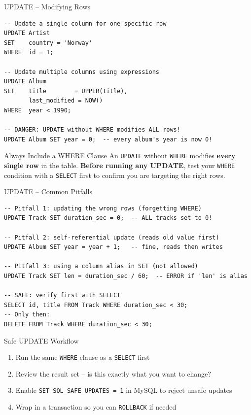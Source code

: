 \begin{frame}[fragile]{UPDATE -- Modifying Rows}
  \begin{lstlisting}[style=sqlstyle]
-- Update a single column for one specific row
UPDATE Artist
SET    country = 'Norway'
WHERE  id = 1;

-- Update multiple columns using expressions
UPDATE Album
SET    title        = UPPER(title),
       last_modified = NOW()
WHERE  year < 1990;

-- DANGER: UPDATE without WHERE modifies ALL rows!
UPDATE Album SET year = 0;  -- every album's year is now 0!
  \end{lstlisting}

  \begin{alertblock}{Always Include a WHERE Clause}
    An \texttt{UPDATE} without \texttt{WHERE} modifies \textbf{every single row} in the table.
    \textbf{Before running any UPDATE}, test your \texttt{WHERE} condition with a \texttt{SELECT}
    first to confirm you are targeting the right rows.
  \end{alertblock}
\end{frame}

\begin{frame}[fragile]{UPDATE -- Common Pitfalls}
  \begin{lstlisting}[style=sqlstyle]
-- Pitfall 1: updating the wrong rows (forgetting WHERE)
UPDATE Track SET duration_sec = 0;  -- ALL tracks set to 0!

-- Pitfall 2: self-referential update (reads old value first)
UPDATE Album SET year = year + 1;   -- fine, reads then writes

-- Pitfall 3: using a column alias in SET (not allowed)
UPDATE Track SET len = duration_sec / 60;  -- ERROR if 'len' is alias

-- SAFE: verify first with SELECT
SELECT id, title FROM Track WHERE duration_sec < 30;
-- Only then:
DELETE FROM Track WHERE duration_sec < 30;
  \end{lstlisting}

  \begin{block}{Safe UPDATE Workflow}
    \begin{enumerate}
      \item Run the same \texttt{WHERE} clause as a \texttt{SELECT} first
      \item Review the result set -- is this exactly what you want to change?
      \item Enable \texttt{SET SQL\_SAFE\_UPDATES = 1} in MySQL to reject unsafe updates
      \item Wrap in a transaction so you can \texttt{ROLLBACK} if needed
    \end{enumerate}
  \end{block}
\end{frame}

